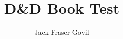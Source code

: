 \documentclass[theme=dnd,size=9pt]{rpgbook}
\title{D\&D Book Test}
\author{Jack Fraser-Govil}
\begin{document}
   


\ExplSyntaxOff
\end{document}
